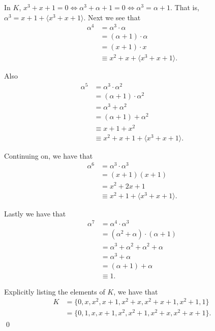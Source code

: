 \documentclass{article}
\begin{document}
In $K$, $x^3 + x + 1 = 0 \iff \alpha^3 + \alpha + 1 = 0 \iff \alpha^3 = \alpha + 1$. That is, $\alpha^3 = x + 1 + \langle x^3 + x + 1\rangle$. Next we see that
\begin{align*}
	\alpha^4 &= \alpha^3 \cdot \alpha \\
	&= (\alpha + 1) \cdot \alpha \\
	&= (x+1) \cdot x \\
	&\equiv x^2 + x + \langle x^3 + x + 1\rangle.
\end{align*}

Also 
\begin{align*}
	\alpha^5 &= \alpha^3 \cdot \alpha^2 \\
	&= (\alpha + 1) \cdot \alpha^2 \\
	&= \alpha^3 + \alpha^2 \\
	&= (\alpha + 1) + \alpha^2 \\
	&\equiv x + 1 + x^2 \\
	&\equiv x^2 + x + 1 + \langle x^3 + x + 1\rangle.
\end{align*}

Continuing on, we have that
\begin{align*}
	\alpha^6 &= \alpha^3 \cdot \alpha^3 \\
	&= (x+1)(x+1) \\
	&= x^2 + 2x + 1 \\
	&\equiv x^2 + 1 + \langle x^3 + x + 1\rangle.
\end{align*}

Lastly we have that 
\begin{align*}
	\alpha^7 &= \alpha^4 \cdot \alpha^3 \\
	&= (\alpha^2 + \alpha) \cdot (\alpha + 1) \\
	&= \alpha^3 + \alpha^2 + \alpha^2 + \alpha \\
	&= \alpha^3 + \alpha \\
	&= (\alpha + 1) + \alpha \\
	&\equiv 1.
\end{align*}

Explicitly listing the elements of $K$, we have that
\begin{align*}
	K &= \{0, x, x^2, x + 1, x^2 + x, x^2 + x + 1, x^2 + 1, 1 \} \\
	&= \{ 0, 1, x, x+1, x^2, x^2+1, x^2+x, x^2+x+1 \}.
\end{align*}
\qed \\
\end{document}
